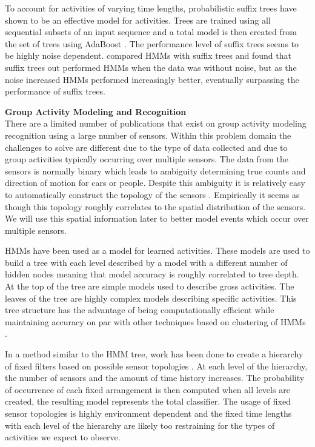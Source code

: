 To account for activities of varying time lengths, probabilistic suffix trees \cite{Hamid2007} have shown to be an effective model for activities.  Trees are trained using all sequential subsets of an input sequence and a total model is then created from the set of trees using AdaBoost \cite{Freund1996}.  The performance level of suffix trees seems to be highly noise dependent.  \cite{Hamid2006} compared HMMs with suffix trees and found that suffix trees out performed HMMs when the data was without noise, but as the noise increased HMMs performed increasingly better, eventually surpassing the performance of suffix trees.

\bigskip
\noindent \textbf{Group Activity Modeling and Recognition} \\
There are a limited number of publications that exist on group activity modeling recognition using a large number of sensors.  Within this problem domain the challenges to solve are different due to the type of data collected and due to group activities typically occurring over multiple sensors.  The data from the sensors is normally binary which leads to ambiguity determining true counts and direction of motion for cars or people.  Despite this ambiguity it is relatively easy to automatically construct the topology of the sensors \cite{Wren2003, Wren2006a}.  Empirically it seems as though this topology roughly correlates to the spatial distribution of the sensors.  We will use this spatial information later to better model events which occur over multiple sensors.
	
HMMs have been used as a model for learned activities.  These models are used to build a tree \cite{Minnen2004, Wren2006a} with each level described by a model with a different number of hidden nodes meaning that model accuracy is roughly correlated to tree depth.  At the top of the tree are simple models used to describe gross activities.  The leaves of the tree are highly complex models describing specific activities.  This tree structure has the advantage of being computationally efficient while maintaining accuracy on par with other techniques based on clustering of HMMs \cite{Clarkson1999}.  
	
In a method similar to the HMM tree, work has been done to create a hierarchy of fixed filters based on possible sensor topologies \cite{Wren2006}.  At each level of the hierarchy, the number of sensors and the amount of time history increases.  The probability of occurrence of each fixed arrangement is then computed when all levels are created, the resulting model represents the total classifier.  The usage of fixed sensor topologies is highly environment dependent and the fixed time lengths with each level of the hierarchy are likely too restraining for the types of activities we expect to observe.  

